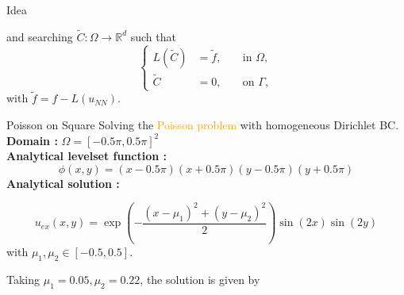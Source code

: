\begin{frame}{Idea}
	\vspace{-8pt}
	\begin{minipage}{\linewidth}
		and searching $\tilde{C}: \Omega \rightarrow \mathbb{R}^d$ such that
		\begin{equation}
			\left\{\begin{aligned}
				L(\tilde{C})&=\tilde{f}, \; &&\text{in } \Omega, \\
				\tilde{C}&=0, \; &&\text{on } \Gamma,
			\end{aligned}\right. \label{corr_add}
		\end{equation}
		with $\tilde{f}=f-L(u_{NN})$. 
	\end{minipage}
\end{frame}

\begin{frame}{Poisson on Square}
	Solving the \textcolor{orange}{Poisson problem} with homogeneous Dirichlet BC. \\
	 \textbf{Domain :} $\Omega=[−0.5\pi,0.5\pi]^2$ \\
	 \textbf{Analytical levelset function :}
	\small
	\begin{equation*}
		\phi(x,y)=(x-0.5\pi)(x+0.5\pi)(y-0.5\pi)(y+0.5\pi)
	\end{equation*} 
	 \textbf{Analytical solution :}
	\small
	
	\vspace{-8pt}
	\begin{equation*}
		u_{ex}(x,y)=\exp\left(−\frac{(x-\mu_1)^2+(y-\mu_2)^2}{2}\right)\sin(2x)\sin(2y)
	\end{equation*} 
	\normalsize
	with $\mu_1,\mu_2\in[-0.5,0.5]$. 
	
	\vspace{8pt}
	Taking $\mu_1=0.05,\mu_2=0.22$, the solution is given by
	\begin{minipage}{0.68\linewidth}
		\centering
	\end{minipage}
	\begin{minipage}{0.28\linewidth}
		\flushright
	\end{minipage}
\end{frame}

